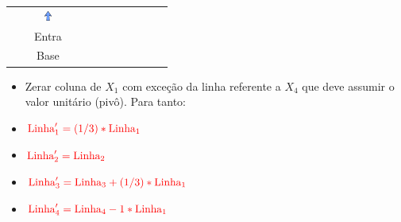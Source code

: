 \begin{frame}
{\begin{table}
\begin{tabular}{c c c c c c c c c c c c}
				& 
				&  \includegraphics[width=0.3cm,height=0.3cm]{setacima.jpg}
				& 
				& 
				& 
				& 
				&  
				&  
				& & & \\
				
				& 
				&  \scriptsize Entra 
				& 
				& 
				& 
				& 
				&  
				&  
				& & & \\
				
				& 
				&  \scriptsize Base
				& 
				& 
				& 
				& 
				&  
				&  
				& & & \\				
			\end{tabular}
		\end{table}
		\begin{itemize}
			\item[]  {Zerar coluna de $X_1$ com exceção da linha referente a $X_4$ que deve assumir o valor unitário (pivô). Para tanto:}
			\item[]  {$ \color{red} \text{Linha}'_1 = (1/3)*\text{Linha}_1 $}
			\item[]  {$ \color{red} \text{Linha}'_2 = \text{Linha}_2 $}
			\item[]  {$ \color{red} \text{Linha}'_3 = \text{Linha}_3 + (1/3)*\text{Linha}_1$}
			\item[]    {$ \color{red} \text{Linha}'_4 = \text{Linha}_4 - 1*\text{Linha}_1$}
		\end{itemize}		
	}		


\end{frame}
